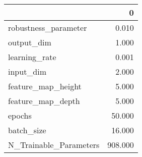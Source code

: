 \begin{tabular}{lr}
\toprule
{} &        0 \\
\midrule
robustness\_parameter   &    0.010 \\
output\_dim             &    1.000 \\
learning\_rate          &    0.001 \\
input\_dim              &    2.000 \\
feature\_map\_height     &    5.000 \\
feature\_map\_depth      &    5.000 \\
epochs                 &   50.000 \\
batch\_size             &   16.000 \\
N\_Trainable\_Parameters &  908.000 \\
\bottomrule
\end{tabular}
